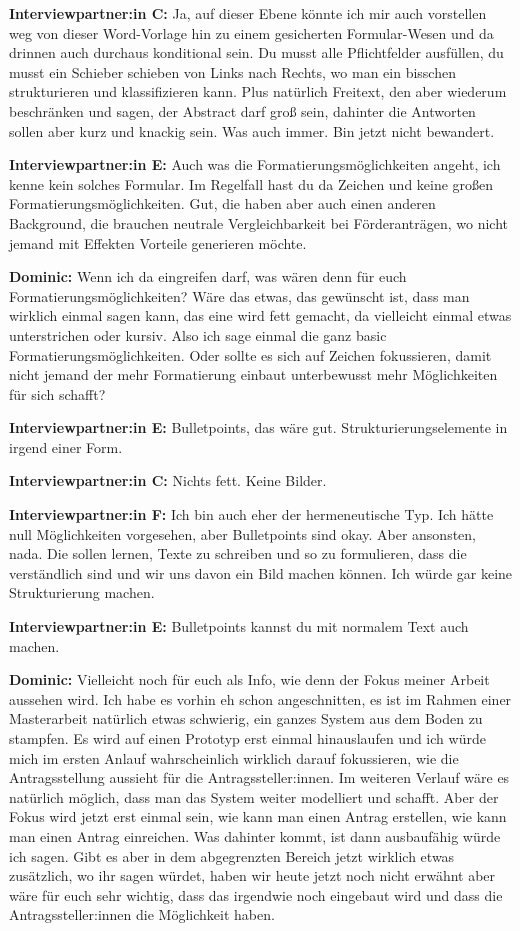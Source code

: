 \documentclass[a4paper,12pt,twoside]{scrreprt}
\begin{document}
\textbf{Interviewpartner:in C:} Ja, auf dieser Ebene könnte ich mir auch vorstellen weg von dieser Word-Vorlage hin zu einem gesicherten Formular-Wesen und da drinnen auch durchaus konditional sein. Du musst alle Pflichtfelder ausfüllen, du musst ein Schieber schieben von Links nach Rechts, wo man ein bisschen strukturieren und klassifizieren kann. Plus natürlich Freitext, den aber wiederum beschränken und sagen, der Abstract darf groß sein, dahinter die Antworten sollen aber kurz und knackig sein. Was auch immer. Bin jetzt nicht bewandert.

\textbf{Interviewpartner:in E:} Auch was die Formatierungsmöglichkeiten angeht, ich kenne kein solches Formular. Im Regelfall hast du da Zeichen und keine großen Formatierungsmöglichkeiten. Gut, die haben aber auch einen anderen Background, die brauchen neutrale Vergleichbarkeit bei Förderanträgen, wo nicht jemand mit Effekten Vorteile generieren möchte.

\textbf{Dominic:} Wenn ich da eingreifen darf, was wären denn für euch Formatierungsmöglichkeiten? Wäre das etwas, das gewünscht ist, dass man wirklich einmal sagen kann, das eine wird fett gemacht, da vielleicht einmal etwas unterstrichen oder kursiv. Also ich sage einmal die ganz basic Formatierungsmöglichkeiten. Oder sollte es sich auf Zeichen fokussieren, damit nicht jemand der mehr Formatierung einbaut unterbewusst mehr Möglichkeiten für sich schafft?

\textbf{Interviewpartner:in E:} Bulletpoints, das wäre gut. Strukturierungselemente in irgend einer Form.

\textbf{Interviewpartner:in C:} Nichts fett. Keine Bilder.

\textbf{Interviewpartner:in F:} Ich bin auch eher der hermeneutische Typ. Ich hätte null Möglichkeiten vorgesehen, aber Bulletpoints sind okay. Aber ansonsten, nada. Die sollen lernen, Texte zu schreiben und so zu formulieren, dass die verständlich sind und wir uns davon ein Bild machen können. Ich würde gar keine Strukturierung machen.

\textbf{Interviewpartner:in E:} Bulletpoints kannst du mit normalem Text auch machen.

\textbf{Dominic:} Vielleicht noch für euch als Info, wie denn der Fokus meiner Arbeit aussehen wird. Ich habe es vorhin eh schon angeschnitten, es ist im Rahmen einer Masterarbeit natürlich etwas schwierig, ein ganzes System aus dem Boden zu stampfen. Es wird auf einen Prototyp erst einmal hinauslaufen und ich würde mich im ersten Anlauf wahrscheinlich wirklich darauf fokussieren, wie die Antragsstellung aussieht für die Antragssteller:innen. Im weiteren Verlauf wäre es natürlich möglich, dass man das System weiter modelliert und schafft. Aber der Fokus wird jetzt erst einmal sein, wie kann man einen Antrag erstellen, wie kann man einen Antrag einreichen. Was dahinter kommt, ist dann ausbaufähig würde ich sagen. Gibt es aber in dem abgegrenzten Bereich jetzt wirklich etwas zusätzlich, wo ihr sagen würdet, haben wir heute jetzt noch nicht erwähnt aber wäre für euch sehr wichtig, dass das irgendwie noch eingebaut wird und dass die Antragssteller:innen die Möglichkeit haben.
\end{document}

